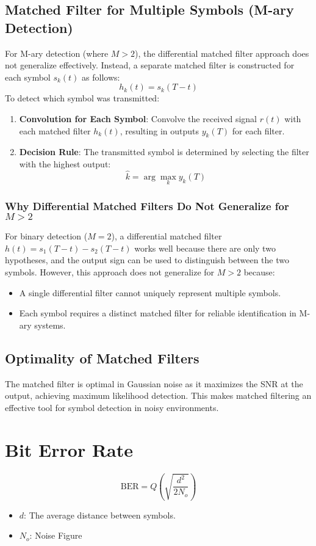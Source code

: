 \documentclass[10pt]{article}
\begin{document}
\subsection{Matched Filter for Multiple Symbols (M-ary Detection)}
For M-ary detection (where \( M > 2 \)), the differential matched filter approach does not generalize effectively. Instead, a separate matched filter is constructed for each symbol \( s_k(t) \) as follows:
\[
h_k(t) = s_k(T - t)
\]
To detect which symbol was transmitted:
\begin{enumerate}
    \item \textbf{Convolution for Each Symbol}: Convolve the received signal \( r(t) \) with each matched filter \( h_k(t) \), resulting in outputs \( y_k(T) \) for each filter.
    \item \textbf{Decision Rule}: The transmitted symbol is determined by selecting the filter with the highest output:
    \[
    \hat{k} = \arg \max_{k} y_k(T)
    \]
\end{enumerate}


\subsubsection{Why Differential Matched Filters Do Not Generalize for \( M > 2 \)}
For binary detection (\( M = 2 \)), a differential matched filter \( h(t) = s_1(T - t) - s_2(T - t) \) works well because there are only two hypotheses, and the output sign can be used to distinguish between the two symbols. However, this approach does not generalize for \( M > 2 \) because:
\begin{itemize}
    \item A single differential filter cannot uniquely represent multiple symbols.
    \item Each symbol requires a distinct matched filter for reliable identification in M-ary systems.
\end{itemize}

\subsection{Optimality of Matched Filters}
The matched filter is optimal in Gaussian noise as it maximizes the SNR at the output, achieving maximum likelihood detection. This makes matched filtering an effective tool for symbol detection in noisy environments.

\section{Bit Error Rate}
\[
    \text{BER} = Q\left(\sqrt{\frac{d^2}{2N_o}}\right)
\]
\begin{itemize}
    \item $d$: The average distance between symbols. 
    \item $N_o$: Noise Figure
\end{itemize}
\end{document}
